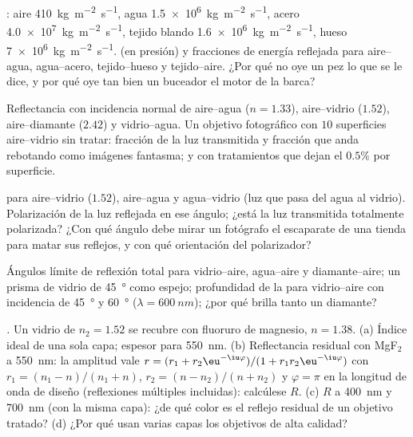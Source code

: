 \begin{exercise}[$\star$]\label{exo:b2:wave-interfaces:1}
: aire \qty{410}{kg.m^{-2}.s^{-1}}, agua \qty{1.5e6}{kg.m^{-2}.s^{-1}},
acero \qty{4.0e7}{kg.m^{-2}.s^{-1}}, tejido blando \qty{1.6e6}{kg.m^{-2}.s^{-1}}, hueso
\qty{7e6}{kg.m^{-2}.s^{-1}}.  (en presión) y fracciones
de energía reflejada para aire--agua, agua--acero, tejido--hueso y
tejido--aire. ¿Por qué no oye un pez lo que se le dice, y por qué oye tan bien un buceador
el motor de la barca?
\end{exercise}

\begin{exercise}[$\star$]\label{exo:b2:wave-interfaces:2}
Reflectancia con incidencia normal de aire--agua ($n = 1.33$), aire--vidrio
($1.52$), aire--diamante ($2.42$) y vidrio--agua. Un objetivo fotográfico con $10$
superficies aire--vidrio sin tratar: fracción de la luz transmitida y
fracción que anda rebotando como imágenes fantasma; y con tratamientos que dejan
el $0.5\%$ por superficie.
\end{exercise}

\begin{exercise}[$\star$]\label{exo:b2:wave-interfaces:3}
 para aire--vidrio ($1.52$), aire--agua y agua--vidrio
(luz que pasa del agua al vidrio). Polarización de la luz reflejada
en ese ángulo; ¿está la luz transmitida totalmente polarizada? ¿Con qué
ángulo debe mirar un fotógrafo el escaparate de una tienda para matar sus
reflejos, y con qué orientación del polarizador?
\end{exercise}

\begin{exercise}[$\star$]\label{exo:b2:wave-interfaces:4}
Ángulos límite de reflexión total para vidrio--aire, agua--aire y
diamante--aire; un prisma de vidrio de \qty{45}{\degree} como espejo; profundidad de la
 para vidrio--aire con incidencia de \qty{45}{\degree} y \qty{60}{\degree}
($\lambda = \qty{600}{nm}$); ¿por qué brilla tanto un diamante?
\end{exercise}

\begin{exercise}[$\star\star$]\label{exo:b2:wave-interfaces:5}
\emph{.} Un vidrio de $n_2 = 1.52$ se recubre con
fluoruro de magnesio, $n = 1.38$. (a) Índice ideal de una sola capa;
espesor para \qty{550}{nm}. (b) Reflectancia residual con MgF$_2$ a
\qty{550}{nm}: la amplitud vale $r = (r_1 + r_2\eu^{-\iu\varphi})/(1 + r_1r_2
\eu^{-\iu\varphi})$ con $r_1 = (n_1 - n)/(n_1 + n)$, $r_2 = (n - n_2)/(n + n_2)$
y $\varphi = \pi$ en la longitud de onda de diseño (reflexiones múltiples
incluidas): calcúlese $R$. (c) $R$ a \qty{400}{nm} y \qty{700}{nm} (con la misma
capa): ¿de qué color es el reflejo residual de un objetivo tratado?
(d) ¿Por qué usan varias capas los objetivos de alta calidad?
\end{exercise}

